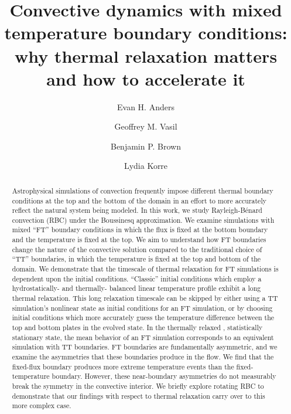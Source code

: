 \documentclass[aps, pre, onecolumn, nofootinbib, notitlepage, groupedaddress, amsfonts, amssymb, amsmath, longbibliography, superscriptaddress]{revtex4-1}
\newcommand{\RB}{Rayleigh-B\'{e}nard }
\newcommand{\ea}[1]{{\color{red} #1}}
\begin{document}
\author{Evan H. Anders}
\author{Geoffrey M. Vasil}
\author{Benjamin P. Brown}
\author{Lydia Korre}

\title{Convective dynamics with mixed temperature boundary conditions: \\
why thermal relaxation matters and how to accelerate it}

\begin{abstract}
Astrophysical simulations of convection frequently impose different thermal boundary conditions at the top and the bottom of the domain in an effort to more accurately reflect the natural system being modeled.
In this work, we study \RB convection (RBC) \ea{under the Boussinesq approximation}.
\ea{We examine simulations with mixed ``FT'' boundary conditions in which the flux is fixed at the bottom boundary and the temperature is fixed at the top.}
We aim to understand how FT boundaries change the nature of the convective solution compared to the traditional choice of \ea{``TT'' boundaries, in which the temperature is fixed} at the top and bottom of the domain.
\ea{We demonstrate that the timescale of thermal relaxation for FT simulations is dependent upon the initial conditions.
``Classic'' initial conditions which employ a hydrostatically- and thermally- balanced linear temperature profile exhibit a long thermal relaxation.
This long relaxation timescale can be skipped by either using a TT simulation's nonlinear state as initial conditions for an FT simulation, or by choosing initial conditions which more accurately guess the temperature difference between the top and bottom plates in the evolved state.}
In the \ea{thermally} relaxed\ea{, statistically stationary} state, the mean behavior of an FT simulation corresponds to an equivalent simulation with TT boundaries.
\ea{FT boundaries are fundamentally asymmetric, and we examine the asymmetries that these boundaries produce in the flow.
We find that the fixed-flux boundary produces more extreme temperature events than the fixed-temperature boundary.
However, these near-boundary asymmetries do not measurably break the symmetry in the convective interior.
We briefly explore rotating RBC to demonstrate that our findings with respect to thermal relaxation carry over to this more complex case.}
\end{abstract}
\maketitle
\end{document}
